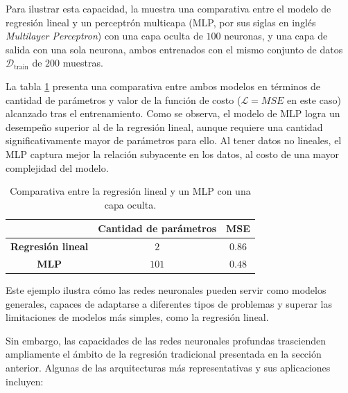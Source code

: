 Para ilustrar esta capacidad, la  muestra una comparativa entre el modelo de regresión lineal y un perceptrón multicapa (MLP, por sus siglas en inglés \textit{Multilayer Perceptron}) con una capa oculta de $100$ neuronas, y una capa de salida con una sola neurona, ambos entrenados con el mismo conjunto de datos $\mathcal{D}_{\mathrm{train}}$ de $200$ muestras.


La tabla \ref{tab:regression_vs_mlp} presenta una comparativa entre ambos modelos en términos de cantidad de parámetros y valor de la función de costo ($\mathcal{L} = MSE$ en este caso) alcanzado tras el entrenamiento. Como se observa, el modelo de MLP logra un desempeño superior al de la regresión lineal, aunque requiere una cantidad significativamente mayor de parámetros para ello. Al tener datos no lineales, el MLP captura mejor la relación subyacente en los datos, al costo de una mayor complejidad del modelo.

\begin{table}[H]
    \centering
    \caption{Comparativa entre la regresión lineal y un MLP con una capa oculta.}
    \begin{tabular}{c c c}
        \toprule
        & \textbf{Cantidad de parámetros} & \textbf{MSE} \\
        \midrule
        \textbf{Regresión lineal} & $2$ & $0.86$ \\
        \textbf{MLP} & $101$ & $0.48$ \\
        \bottomrule
    \end{tabular}
    \label{tab:regression_vs_mlp}
\end{table}

Este ejemplo ilustra cómo las redes neuronales pueden servir como modelos generales, capaces de adaptarse a diferentes tipos de problemas y superar las limitaciones de modelos más simples, como la regresión lineal.

Sin embargo, las capacidades de las redes neuronales profundas trascienden ampliamente el ámbito de la regresión tradicional presentada en la sección anterior. Algunas de las arquitecturas más representativas y sus aplicaciones incluyen:

